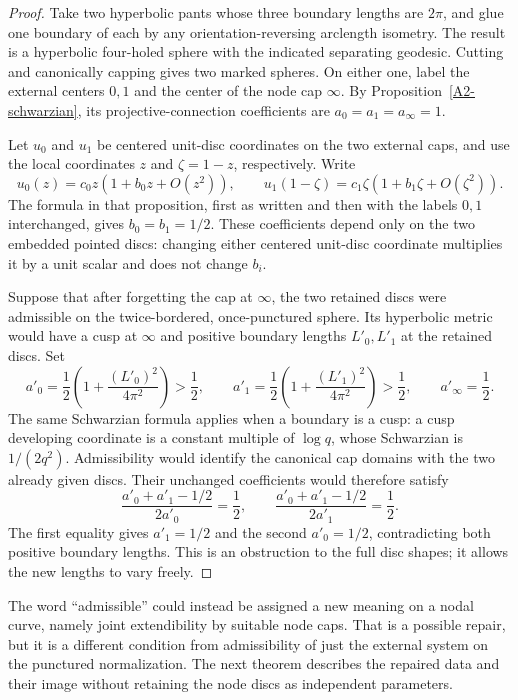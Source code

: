 \begin{proof}
Take two hyperbolic pants whose three boundary lengths are $2\pi$,
and glue one boundary of each by any orientation-reversing arclength
isometry. The result is a hyperbolic four-holed sphere with the
indicated separating geodesic. Cutting and canonically capping gives
two marked spheres. On either one, label the external centers $0,1$
and the center of the node cap $\infty$. By
Proposition~\ref{A2-schwarzian}, its projective-connection
coefficients are $a_0=a_1=a_\infty=1$.

Let $u_0$ and $u_1$ be centered unit-disc coordinates on the two
external caps, and use the local coordinates $z$ and $\zeta=1-z$,
respectively. Write
\[
 u_0(z)=c_0z(1+b_0z+O(z^2)),\qquad
 u_1(1-\zeta)=c_1\zeta(1+b_1\zeta+O(\zeta^2)).
\]
The formula in that proposition, first as written and then with the
labels $0,1$ interchanged, gives $b_0=b_1=1/2$. These coefficients
depend only on the two embedded pointed discs: changing either
centered unit-disc coordinate multiplies it by a unit scalar and
does not change $b_i$.

Suppose that after forgetting the cap at $\infty$, the two retained
discs were admissible on the twice-bordered, once-punctured sphere.
Its hyperbolic metric would have a cusp at $\infty$ and positive
boundary lengths $L'_0,L'_1$ at the retained discs. Set
\[
 a'_0=\frac12\left(1+\frac{(L'_0)^2}{4\pi^2}\right)>\frac12,
 \qquad
 a'_1=\frac12\left(1+\frac{(L'_1)^2}{4\pi^2}\right)>\frac12,
 \qquad a'_\infty=\frac12.
\]
The same Schwarzian formula applies when a boundary is a cusp: a
cusp developing coordinate is a constant multiple of $\log q$,
whose Schwarzian is $1/(2q^2)$. Admissibility would identify the
canonical cap domains with the two already given discs. Their
unchanged coefficients would therefore satisfy
\[
 \frac{a'_0+a'_1-1/2}{2a'_0}=\frac12,
 \qquad
 \frac{a'_0+a'_1-1/2}{2a'_1}=\frac12.
\]
The first equality gives $a'_1=1/2$ and the second $a'_0=1/2$,
contradicting both positive boundary lengths. This is an obstruction
to the full disc shapes; it allows the new lengths to vary freely.
\end{proof}

The word ``admissible'' could instead be assigned a new meaning on
a nodal curve, namely joint extendibility by suitable node caps.
That is a possible repair, but it is a different condition from
admissibility of just the external system on the punctured
normalization. The next theorem describes the repaired data and
their image without retaining the node discs as independent
parameters.

